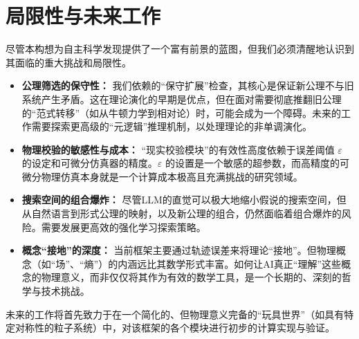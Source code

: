 \documentclass[11pt, a4paper]{article}
\begin{document}
\section{局限性与未来工作}
尽管本构想为自主科学发现提供了一个富有前景的蓝图，但我们必须清醒地认识到其面临的重大挑战和局限性。

\begin{itemize}
	\item \textbf{公理筛选的保守性：} 我们依赖的“保守扩展”检查，其核心是保证新公理不与旧系统产生矛盾。这在理论演化的早期是优点，但在面对需要彻底推翻旧公理的“范式转移”（如从牛顿力学到相对论）时，可能会成为一个障碍。未来的工作需要探索更高级的“元逻辑”推理机制，以处理理论的非单调演化。
	
	\item \textbf{物理校验的敏感性与成本：} “现实校验模块”的有效性高度依赖于误差阈值 $\varepsilon$ 的设定和可微分仿真器的精度。$\varepsilon$ 的设置是一个敏感的超参数，而高精度的可微分物理仿真本身就是一个计算成本极高且充满挑战的研究领域。
	
	\item \textbf{搜索空间的组合爆炸：} 尽管LLM的直觉可以极大地缩小假说的搜索空间，但从自然语言到形式公理的映射，以及新公理的组合，仍然面临着组合爆炸的风险。需要发展更高效的强化学习探索策略。
	
	\item \textbf{概念“接地”的深度：} 当前框架主要通过轨迹误差来将理论“接地”。但物理概念（如“场”、“熵”）的内涵远比其数学形式丰富。如何让AI真正“理解”这些概念的物理意义，而非仅仅将其作为有效的数学工具，是一个长期的、深刻的哲学与技术挑战。
\end{itemize}

未来的工作将首先致力于在一个简化的、但物理意义完备的“玩具世界”（如具有特定对称性的粒子系统）中，对该框架的各个模块进行初步的计算实现与验证。

\printbibliography
\end{document}

